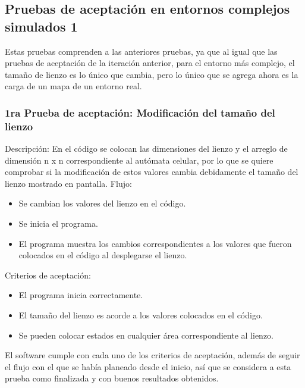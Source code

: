 \subsection{Pruebas de aceptaci\'on en entornos complejos simulados 1}
    Estas pruebas comprenden a las anteriores pruebas, ya que al
        igual que las pruebas de aceptaci\'on de la iteraci\'on anterior,
        para el entorno m\'as complejo, el tama\~no de lienzo es lo
        \'unico que cambia, pero lo \'unico que se agrega ahora es la
        carga de un mapa de un entorno real.
    \vskip 0.5cm
    \subsubsection{1ra Prueba de aceptaci\'on: Modificaci\'on del tama\~no del lienzo}
        Descripci\'on: En el c\'odigo se colocan las dimensiones del
            lienzo y el arreglo de dimensi\'on n x n correspondiente al
            aut\'omata celular, por lo que se quiere comprobar si la
            modificaci\'on de estos valores cambia debidamente el
            tama\~no del lienzo mostrado en pantalla.
        \vskip 0.5cm
        Flujo:
        \begin{itemize}
            \item Se cambian los valores del lienzo en el c\'odigo.
            \item Se inicia el programa.
            \item El programa muestra los cambios correspondientes a los
            valores que fueron colocados en el c\'odigo al
            desplegarse el lienzo.
        \end{itemize}
        \vskip 0.5cm
        Criterios de aceptaci\'on:
        \begin{itemize}
            \item El programa inicia correctamente.
            \item El tama\~no del lienzo es acorde a los valores colocados
            en el c\'odigo.
            \item Se pueden colocar estados en cualquier \'area
            correspondiente al lienzo.
        \end{itemize}
        \vskip 0.5cm
        El software cumple con cada uno de los criterios de
            aceptaci\'on, adem\'as de seguir el flujo con el que se hab\'ia
            planeado desde el inicio, as\'i que se considera a esta prueba
            como finalizada y con buenos resultados obtenidos.
    \vskip 0.5cm
